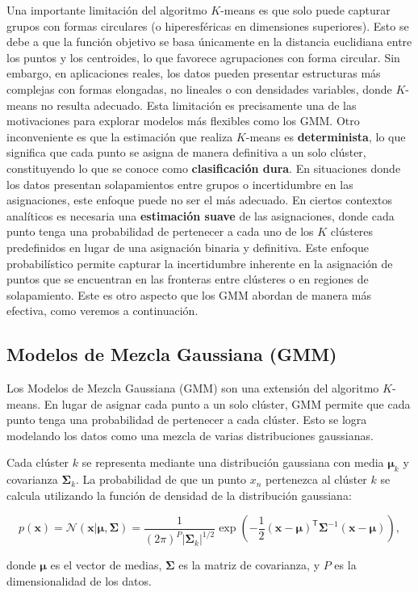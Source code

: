 Una importante limitación del algoritmo \(K\)-means es que solo puede capturar grupos con formas circulares (o hiperesféricas en dimensiones superiores). Esto se debe a que la función objetivo se basa únicamente en la distancia euclidiana entre los puntos y los centroides, lo que favorece agrupaciones con forma circular. Sin embargo, en aplicaciones reales, los datos pueden presentar estructuras más complejas con formas elongadas, no lineales o con densidades variables, donde \(K\)-means no resulta adecuado. Esta limitación es precisamente una de las motivaciones para explorar modelos más flexibles como los GMM. Otro inconveniente es que la estimación que realiza \(K\)-means es \textbf{determinista}, lo que significa que cada punto se asigna de manera definitiva a un solo clúster, constituyendo lo que se conoce como \textbf{clasificación dura}. En situaciones donde los datos presentan solapamientos entre grupos o incertidumbre en las asignaciones, este enfoque puede no ser el más adecuado. En ciertos contextos analíticos es necesaria una \textbf{estimación suave} de las asignaciones, donde cada punto tenga una probabilidad de pertenecer a cada uno de los \(K\) clústeres predefinidos en lugar de una asignación binaria y definitiva. Este enfoque probabilístico permite capturar la incertidumbre inherente en la asignación de puntos que se encuentran en las fronteras entre clústeres o en regiones de solapamiento. Este es otro aspecto que los GMM abordan de manera más efectiva, como veremos a continuación.

\subsection{Modelos de Mezcla Gaussiana (GMM)}

Los Modelos de Mezcla Gaussiana (GMM) son una extensión del algoritmo \(K\)-means. En lugar de asignar cada punto a un solo clúster, GMM permite que cada punto tenga una probabilidad de pertenecer a cada clúster. Esto se logra modelando los datos como una mezcla de varias distribuciones gaussianas.

Cada clúster \(k\) se representa mediante una distribución gaussiana con media \(\boldsymbol{\mu}_k\) y covarianza \(\boldsymbol{\Sigma}_k\). La probabilidad de que un punto \(x_n\) pertenezca al clúster \(k\) se calcula utilizando la función de densidad de la distribución gaussiana:

\[
p(\boldsymbol{x}) = \mathcal{N}(\boldsymbol{x} | \boldsymbol{\mu}, \boldsymbol{\Sigma}
)=\frac{1}{(2\pi)^{P} |\boldsymbol{\Sigma}_k|^{1/2}} \exp\left(-\frac{1}{2} (\boldsymbol{x} - \boldsymbol{\mu})^\mathsf{T} \boldsymbol{\Sigma}^{-1} (\boldsymbol{x} - \boldsymbol{\mu})\right),
\]

donde \(\boldsymbol{\mu}\) es el vector de medias, \(\boldsymbol{\Sigma}\) es la matriz de covarianza, y \(P\) es la dimensionalidad de los datos. 

